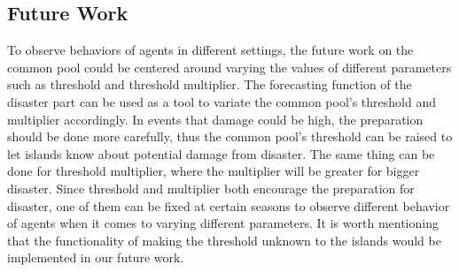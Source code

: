 \subsection{Future Work}

To observe behaviors of agents in different settings, the future work on the common pool could be centered around varying the values of different parameters such as threshold and threshold multiplier. The forecasting function of the disaster part can be used as a tool to variate the common pool’s threshold and multiplier accordingly. In events that damage could be high, the preparation should be done more carefully, thus the common pool’s threshold can be raised to let islands know about potential damage from disaster. The same thing can be done for threshold multiplier, where the multiplier will be greater for bigger disaster. Since threshold and multiplier both encourage the preparation for disaster, one of them can be fixed at certain seasons to observe different behavior of agents when it comes to varying different parameters. It is worth mentioning that the functionality of making the threshold unknown to the islands would be implemented in our future work.